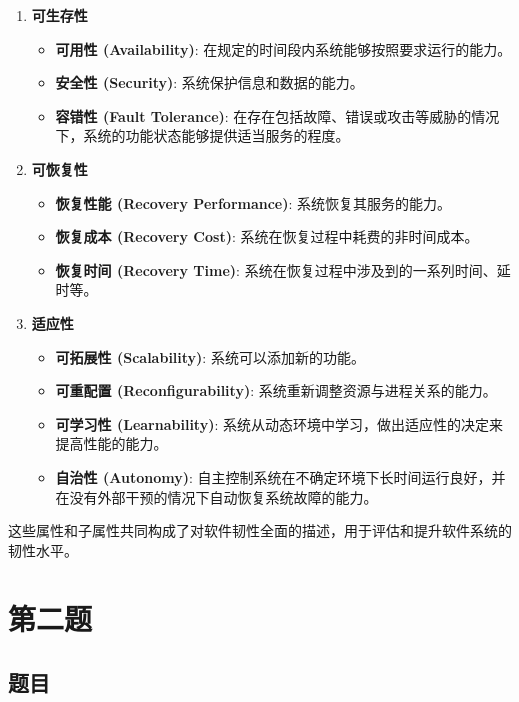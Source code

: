 \documentclass{article}
\begin{document}
\begin{enumerate}
	\item 
	\textbf{可生存性}
	
	\begin{itemize}
		\item \textbf{可用性 (Availability)}: 在规定的时间段内系统能够按照要求运行的能力。
		\item \textbf{安全性 (Security)}: 系统保护信息和数据的能力。
		\item \textbf{容错性 (Fault Tolerance)}: 在存在包括故障、错误或攻击等威胁的情况下，系统的功能状态能够提供适当服务的程度。
	\end{itemize}
		
	\item 
	\textbf{可恢复性}
	
	\begin{itemize}
		\item \textbf{恢复性能 (Recovery Performance)}: 系统恢复其服务的能力。
		\item \textbf{恢复成本 (Recovery Cost)}: 系统在恢复过程中耗费的非时间成本。
		\item \textbf{恢复时间 (Recovery Time)}: 系统在恢复过程中涉及到的一系列时间、延时等。
	\end{itemize}
	
	\item 
	\textbf{适应性}
	
	\begin{itemize}
		\item \textbf{可拓展性 (Scalability)}: 系统可以添加新的功能。
		\item \textbf{可重配置 (Reconfigurability)}: 系统重新调整资源与进程关系的能力。
		\item \textbf{可学习性 (Learnability)}: 系统从动态环境中学习，做出适应性的决定来提高性能的能力。
		\item \textbf{自治性 (Autonomy)}: 自主控制系统在不确定环境下长时间运行良好，并在没有外部干预的情况下自动恢复系统故障的能力。
	\end{itemize}
	
\end{enumerate}

这些属性和子属性共同构成了对软件韧性全面的描述，用于评估和提升软件系统的韧性水平。

\section{第二题}

\subsection{题目}
\end{document}
